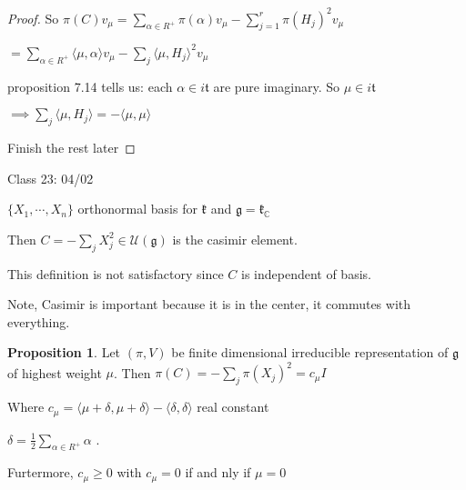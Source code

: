 \documentclass{article}
\theoremstyle{definition}
\newtheorem{proposition}{Proposition}
\begin{document}
\begin{proof}
    So \(\pi(C)v_\mu = \sum_{\alpha \in R^+} \pi(\alpha)v_\mu - \sum_{j=1} ^r \pi(H_j)^2 v_\mu \) 

    \(= \sum_{\alpha \in R^+} \langle \mu , \alpha \rangle v_\mu - \sum_{j} \langle \mu , H_j \rangle ^2 v_\mu   \) 

    proposition 7.14 tells us: each \(\alpha\in i \mathfrak{t}\) are pure imaginary. So \(\mu \in i \mathfrak{t} \) 

    \(\implies \sum_{j} \langle \mu , H_j \rangle = - \langle \mu , \mu  \rangle  \) 

    Finish the rest later

\end{proof}

\hrulefill

Class 23: 04/02

\(\{ X_1,\cdots,X_n \}\) orthonormal basis for \(\mathfrak{k}\) and \(\mathfrak{g} = \mathfrak{k}_\mathbb{C}\)

Then \(C = - \sum_{j} X_j^2\in \mathcal{U}(\mathfrak{g})\) is the casimir element.

This definition is not satisfactory since \(C\) is independent of basis.

Note, Casimir is important because it is in the center, it commutes with everything.

\begin{proposition}
    Let \((\pi ,V)\) be finite dimensional irreducible representation of \(\mathfrak{g}\) of highest weight \(\mu\). Then \(\pi(C)=-\sum_{j} \pi (X_j)^2=c_\mu I\)
    
    Where \(c_\mu = \langle \mu + \delta , \mu + \delta \rangle - \langle \delta , \delta \rangle  \) real constant
    
    \(\delta = \frac{1}{2}\sum_{\alpha \in R^+} \alpha\) .

    Furtermore, \(c_\mu \geq 0\) with \(c_\mu = 0\) if and nly if \(\mu =0\)  
\end{proposition}
\end{document}
